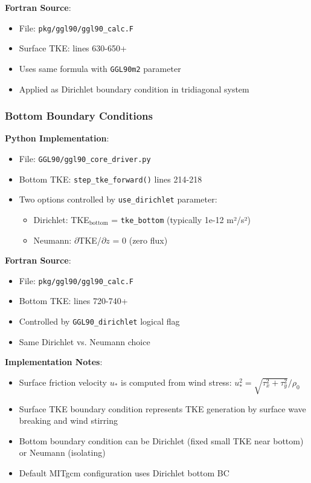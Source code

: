 \documentclass[11pt]{article}
\begin{document}
\textbf{Fortran Source}:
\begin{itemize}
    \item File: \verb|pkg/ggl90/ggl90_calc.F|
    \item Surface TKE: lines 630-650+
    \item Uses same formula with \verb|GGL90m2| parameter
    \item Applied as Dirichlet boundary condition in tridiagonal system
\end{itemize}

\subsubsection{Bottom Boundary Conditions}

\textbf{Python Implementation}:
\begin{itemize}
    \item File: \verb|GGL90/ggl90_core_driver.py|
    \item Bottom TKE: \verb|step_tke_forward()| lines 214-218
    \item Two options controlled by \verb|use_dirichlet| parameter:
        \begin{itemize}
            \item Dirichlet: TKE$_{\text{bottom}}$ = \verb|tke_bottom| (typically 1e-12 m²/s²)
            \item Neumann: $\partial$TKE/$\partial z$ = 0 (zero flux)
        \end{itemize}
\end{itemize}

\textbf{Fortran Source}:
\begin{itemize}
    \item File: \verb|pkg/ggl90/ggl90_calc.F|
    \item Bottom TKE: lines 720-740+
    \item Controlled by \verb|GGL90_dirichlet| logical flag
    \item Same Dirichlet vs. Neumann choice
\end{itemize}

\textbf{Implementation Notes}:
\begin{itemize}
    \item Surface friction velocity $u_*$ is computed from wind stress: $u_*^2 = \sqrt{\tau_x^2 + \tau_y^2} / \rho_0$
    \item Surface TKE boundary condition represents TKE generation by surface wave breaking and wind stirring
    \item Bottom boundary condition can be Dirichlet (fixed small TKE near bottom) or Neumann (isolating)
    \item Default MITgcm configuration uses Dirichlet bottom BC
\end{itemize}
\end{document}

